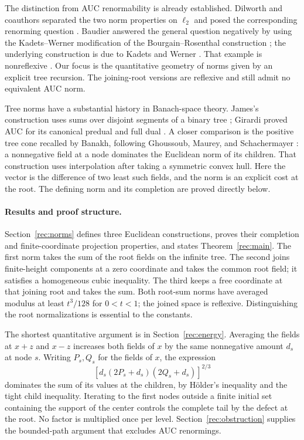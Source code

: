 The distinction from AUC renormability is already established.
Dilworth and coauthors separated the two norm properties on $\ell_2$
and posed the corresponding renorming question
\cite[Theorem~2.4 and Section~5]{DKRRZ2016}.
Baudier answered the general question negatively by using the
Kadets--Werner modification of the Bourgain--Rosenthal construction
\cite[Theorem~1 and Corollary~1]{Baudier2026}; the underlying construction
is due to Kadets and Werner \cite[Theorem~2.5]{KW2004}.
That example is nonreflexive \cite[Corollary~2.6]{KW2004}.
Our focus is the quantitative geometry of norms given by an explicit
tree recursion. The joining-root versions are reflexive and still
admit no equivalent AUC norm.

Tree norms have a substantial history in Banach-space theory.
James's construction uses sums over disjoint segments of a binary
tree \cite[p.~739]{James1974}; Girardi proved AUC for its canonical
predual and full dual \cite[Theorems~3 and~5]{Girardi2001}.
A closer comparison is the positive tree cone recalled by Banakh,
following Ghoussoub, Maurey, and Schachermayer
\cite[Section~2.I, pp.~28--29]{Banakh2000}: a nonnegative field at a
node dominates the Euclidean norm of its children. That construction
uses interpolation after taking a symmetric convex hull. Here the
vector is the difference of two least such fields, and the norm is an
explicit cost at the root. The defining norm and its completion are
proved directly below.

\paragraph{Results and proof structure.}
Section~\ref{rec:norms} defines three Euclidean constructions, proves
their completion and finite-coordinate projection properties, and
states Theorem~\ref{rec:main}. The first norm takes the sum of the
root fields on the infinite tree. The second joins finite-height components at
a zero coordinate and takes the common root field; it satisfies a
homogeneous cubic inequality. The third keeps a free coordinate at
that joining root and takes the sum. Both root-sum norms have averaged
modulus at least $t^3/128$ for $0<t<1$; the joined space is reflexive.
Distinguishing the root
normalizations is essential to the constants.

The shortest quantitative argument is in Section~\ref{rec:energy}.
Averaging the fields at $x+z$ and $x-z$ increases both fields of $x$
by the same nonnegative amount $d_s$ at node $s$. Writing $P_s,Q_s$ for
the fields of $x$, the expression
\[
 [d_s(2P_s+d_s)(2Q_s+d_s)]^{2/3}
\]
dominates the sum of its values at the children, by H\"older's
inequality and the tight child inequality. Iterating to the first
nodes outside a finite initial set containing the support of the center
controls the complete tail
by the defect at the root. No factor is multiplied once per level.
Section~\ref{rec:obstruction} supplies the bounded-path argument that
excludes AUC renormings.

